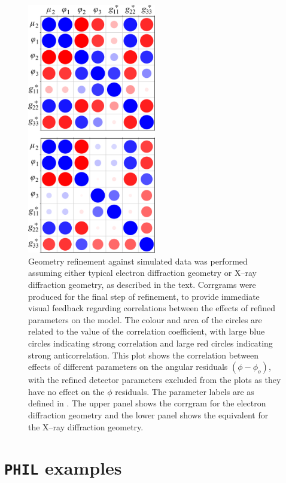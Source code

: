 \documentclass[preprint]{iucr}
\newcommand{\code}{\texttt}
\begin{document}
\begin{figure}
  \label{fig:corrgram}
  \centering
  \caption{
    Geometry refinement against simulated data was performed assuming either
    typical electron diffraction geometry or X--ray diffraction geometry, as
    described in the text. Corrgrams were produced for the final step of
    refinement, to provide immediate visual feedback regarding correlations
    between the effects of refined parameters on the model.
    The colour and area of the circles are related
    to the value of the correlation coefficient, with large blue circles
    indicating strong correlation and large red circles indicating strong
    anticorrelation. This plot shows the correlation between effects of
    different parameters on the angular residuals $(\phi - \phi_o)$,
    with the refined detector parameters excluded from the plots as they have
    no effect on the $\phi$ residuals. The parameter labels are as defined in
    . The upper panel shows the corrgram for the
    electron diffraction geometry and the lower panel shows the equivalent for
    the X--ray diffraction geometry.
  }
  \includegraphics[width=0.5\textwidth]{Figures/simulation/corrgrams_phi.png}
\end{figure}

\appendix

\section{\code{PHIL} examples \label{app:PHIL_example}}
\end{document}
